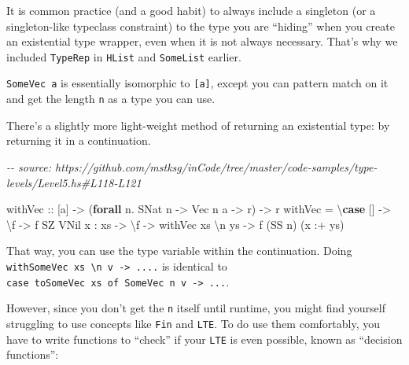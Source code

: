 \documentclass[]{article}
\newenvironment{Shaded}{}{}
\newcommand{\CommentTok}[1]{\textcolor[rgb]{0.38,0.63,0.69}{\textit{#1}}}
\newcommand{\DataTypeTok}[1]{\textcolor[rgb]{0.56,0.13,0.00}{#1}}
\newcommand{\KeywordTok}[1]{\textcolor[rgb]{0.00,0.44,0.13}{\textbf{#1}}}
\newcommand{\NormalTok}[1]{#1}
\newcommand{\OperatorTok}[1]{\textcolor[rgb]{0.40,0.40,0.40}{#1}}
\newcommand{\OtherTok}[1]{\textcolor[rgb]{0.00,0.44,0.13}{#1}}
\begin{document}
It is common practice (and a good habit) to always include a singleton (or a
singleton-like typeclass constraint) to the type you are ``hiding'' when you
create an existential type wrapper, even when it is not always necessary. That's
why we included \texttt{TypeRep} in \texttt{HList} and \texttt{SomeList}
earlier.

\texttt{SomeVec\ a} is essentially isomorphic to \texttt{{[}a{]}}, except you
can pattern match on it and get the length \texttt{n} as a type you can use.

There's a slightly more light-weight method of returning an existential type: by
returning it in a continuation.

\begin{Shaded}
\begin{Highlighting}[]
\CommentTok{{-}{-} source: https://github.com/mstksg/inCode/tree/master/code{-}samples/type{-}levels/Level5.hs\#L118{-}L121}

\OtherTok{withVec ::}\NormalTok{ [a] }\OtherTok{{-}\textgreater{}}\NormalTok{ (}\KeywordTok{forall}\NormalTok{ n}\OperatorTok{.} \DataTypeTok{SNat}\NormalTok{ n }\OtherTok{{-}\textgreater{}} \DataTypeTok{Vec}\NormalTok{ n a }\OtherTok{{-}\textgreater{}}\NormalTok{ r) }\OtherTok{{-}\textgreater{}}\NormalTok{ r}
\NormalTok{withVec }\OtherTok{=}\NormalTok{ \textbackslash{}}\KeywordTok{case}
\NormalTok{  [] }\OtherTok{{-}\textgreater{}}\NormalTok{ \textbackslash{}f }\OtherTok{{-}\textgreater{}}\NormalTok{ f }\DataTypeTok{SZ} \DataTypeTok{VNil}
\NormalTok{  x }\OperatorTok{:}\NormalTok{ xs }\OtherTok{{-}\textgreater{}}\NormalTok{ \textbackslash{}f }\OtherTok{{-}\textgreater{}}\NormalTok{ withVec xs \textbackslash{}n ys }\OtherTok{{-}\textgreater{}}\NormalTok{ f (}\DataTypeTok{SS}\NormalTok{ n) (x }\OperatorTok{:+}\NormalTok{ ys)}
\end{Highlighting}
\end{Shaded}

That way, you can use the type variable within the continuation. Doing
\texttt{withSomeVec\ xs\ \textbackslash{}n\ v\ -\textgreater{}\ ....} is
identical to
\texttt{case\ toSomeVec\ xs\ of\ SomeVec\ n\ v\ -\textgreater{}\ ...}.

However, since you don't get the \texttt{n} itself until runtime, you might find
yourself struggling to use concepts like \texttt{Fin} and \texttt{LTE}. To do
use them comfortably, you have to write functions to ``check'' if your
\texttt{LTE} is even possible, known as ``decision functions'':
\end{document}
